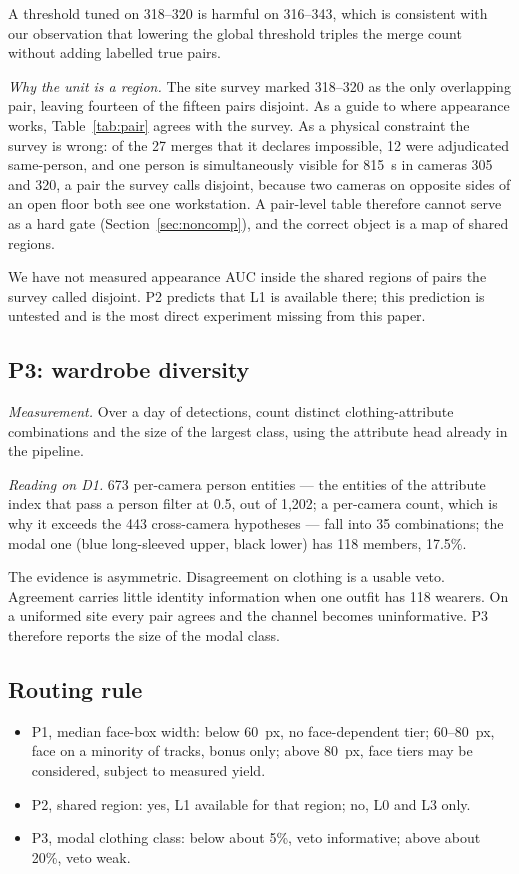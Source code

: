 \documentclass[journal]{IEEEtran}
\begin{document}
A threshold tuned on 318--320 is harmful on 316--343, which is consistent with our observation that lowering the global threshold triples the merge count without adding labelled true pairs.

\emph{Why the unit is a region.} The site survey marked 318--320 as the only overlapping pair, leaving fourteen of the fifteen pairs disjoint. As a guide to where appearance works, Table~\ref{tab:pair} agrees with the survey. As a physical constraint the survey is wrong: of the 27 merges that it declares impossible, 12 were adjudicated same-person, and one person is simultaneously visible for 815~s in cameras 305 and 320, a pair the survey calls disjoint, because two cameras on opposite sides of an open floor both see one workstation. A pair-level table therefore cannot serve as a hard gate (Section~\ref{sec:noncomp}), and the correct object is a map of shared regions.

We have not measured appearance AUC inside the shared regions of pairs the survey called disjoint. P2 predicts that L1 is available there; this prediction is untested and is the most direct experiment missing from this paper.

\subsection{P3: wardrobe diversity}
\emph{Measurement.} Over a day of detections, count distinct clothing-attribute combinations and the size of the largest class, using the attribute head already in the pipeline.

\emph{Reading on D1.} 673 per-camera person entities --- the entities of the attribute index that pass a person filter at 0.5, out of 1,202; a per-camera count, which is why it exceeds the 443 cross-camera hypotheses --- fall into 35 combinations; the modal one (blue long-sleeved upper, black lower) has 118 members, 17.5\%.

The evidence is asymmetric. Disagreement on clothing is a usable veto. Agreement carries little identity information when one outfit has 118 wearers. On a uniformed site every pair agrees and the channel becomes uninformative. P3 therefore reports the size of the modal class.

\subsection{Routing rule}
\begin{itemize}
\item P1, median face-box width: below 60~px, no face-dependent tier; 60--80~px, face on a minority of tracks, bonus only; above 80~px, face tiers may be considered, subject to measured yield.
\item P2, shared region: yes, L1 available for that region; no, L0 and L3 only.
\item P3, modal clothing class: below about 5\%, veto informative; above about 20\%, veto weak.
\end{itemize}
\end{document}
